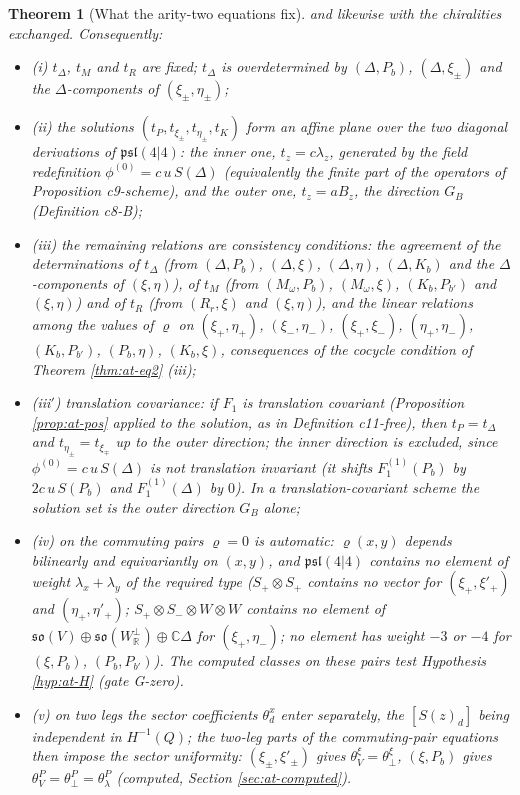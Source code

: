 \documentclass[11pt]{article}
\numberwithin{equation}{section}
\theoremstyle{plain}
\newtheorem{theorem}{Theorem}[section]
\theoremstyle{definition}
\begin{document}
\begin{theorem}[What the arity-two equations fix]
and likewise with the chiralities exchanged. Consequently:
\begin{itemize}
\item (i) $t_\Delta$, $t_M$ and $t_R$ are fixed; $t_\Delta$ is overdetermined by $(\Delta,P_b)$, $(\Delta,\xi_\pm)$ and the $\Delta$-components of $(\xi_\pm,\eta_\pm)$;
\item (ii) the solutions $(t_P,t_{\xi_\pm},t_{\eta_\pm},t_K)$ form an affine plane over the two diagonal derivations of $\mathfrak{psl}(4|4)$: the inner one, $t_z=c\lambda_z$, generated by the field redefinition $\phi^{(0)}=c\,u\,S(\Delta)$ (equivalently the finite part of the operators of Proposition c9-scheme), and the outer one, $t_z=aB_z$, the direction $G_B$ (Definition c8-B);
\item (iii) the remaining relations are consistency conditions: the agreement of the determinations of $t_\Delta$ (from $(\Delta,P_b)$, $(\Delta,\xi)$, $(\Delta,\eta)$, $(\Delta,K_b)$ and the $\Delta$-components of $(\xi,\eta)$), of $t_M$ (from $(M_\omega,P_b)$, $(M_\omega,\xi)$, $(K_b,P_{b'})$ and $(\xi,\eta)$) and of $t_R$ (from $(R_r,\xi)$ and $(\xi,\eta)$), and the linear relations among the values of $\varrho$ on $(\xi_+,\eta_+)$, $(\xi_-,\eta_-)$, $(\xi_+,\xi_-)$, $(\eta_+,\eta_-)$, $(K_b,P_{b'})$, $(P_b,\eta)$, $(K_b,\xi)$, consequences of the cocycle condition of Theorem \ref{thm:at-eq2} (iii);
\item (iii$'$) translation covariance: if $F_1$ is translation covariant (Proposition \ref{prop:at-pos} applied to the solution, as in Definition c11-free), then $t_P=t_\Delta$ and $t_{\eta_\pm}=t_{\xi_\mp}$ up to the outer direction; the inner direction is excluded, since $\phi^{(0)}=c\,u\,S(\Delta)$ is not translation invariant (it shifts $F_1^{(1)}(P_b)$ by $2c\,u\,S(P_b)$ and $F_1^{(1)}(\Delta)$ by $0$). In a translation-covariant scheme the solution set is the outer direction $G_B$ alone;
\item (iv) on the commuting pairs $\varrho=0$ is automatic: $\varrho(x,y)$ depends bilinearly and equivariantly on $(x,y)$, and $\mathfrak{psl}(4|4)$ contains no element of weight $\lambda_x+\lambda_y$ of the required type ($S_+\otimes S_+$ contains no vector for $(\xi_+,\xi'_+)$ and $(\eta_+,\eta'_+)$; $S_+\otimes S_-\otimes W\otimes W$ contains no element of $\mathfrak{so}(V)\oplus\mathfrak{so}(W^\perp_{\mathbb R})\oplus\mathbb C\Delta$ for $(\xi_+,\eta_-)$; no element has weight $-3$ or $-4$ for $(\xi,P_b)$, $(P_b,P_{b'})$). The computed classes on these pairs test Hypothesis \ref{hyp:at-H} (gate G-zero).
\item (v) on two legs the sector coefficients $\theta^x_d$ enter separately, the $[S(z)_d]$ being independent in $H^{-1}(Q)$; the two-leg parts of the commuting-pair equations then impose the sector uniformity: $(\xi_\pm,\xi'_\pm)$ gives $\theta^\xi_V=\theta^\xi_\perp$, $(\xi,P_b)$ gives $\theta^P_V=\theta^P_\perp=\theta^P_\lambda$ (computed, Section \ref{sec:at-computed}).
\end{itemize}
\end{theorem}
\end{document}

